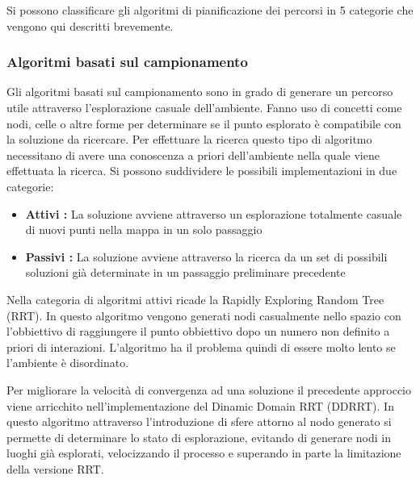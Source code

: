 Si possono classificare gli algoritmi di pianificazione dei percorsi in 5 categorie che vengono qui descritti brevemente.

\subsubsection{Algoritmi basati sul campionamento}

Gli algoritmi basati sul campionamento sono in grado di generare un percorso utile attraverso l'esplorazione casuale dell'ambiente. Fanno uso di concetti come nodi, celle o altre forme per determinare se il punto esplorato è compatibile con la soluzione da ricercare. Per effettuare la ricerca questo tipo di algoritmo necessitano di avere una conoscenza a priori dell'ambiente nella quale viene effettuata la ricerca.
Si possono suddividere le possibili implementazioni in due categorie:
\begin{itemize}
	\item \textbf{Attivi : } La soluzione avviene attraverso un esplorazione totalmente casuale di nuovi punti nella mappa in un solo passaggio
	\item \textbf{Passivi : }  La soluzione avviene attraverso la ricerca da un set di possibili soluzioni già determinate in un passaggio preliminare precedente
\end{itemize}





Nella categoria di algoritmi attivi ricade la Rapidly Exploring Random Tree (RRT). In questo algoritmo vengono generati nodi casualmente nello spazio con l'obbiettivo di raggiungere il punto obbiettivo dopo un numero non definito a priori di interazioni. L'algoritmo ha il problema quindi di essere molto lento se l'ambiente è disordinato.

Per migliorare la velocità di convergenza ad una soluzione il precedente approccio viene arricchito nell'implementazione del Dinamic Domain RRT (DDRRT). In questo algoritmo attraverso l'introduzione di sfere attorno al nodo generato si permette di determinare lo stato di esplorazione, evitando di generare nodi in luoghi già esplorati, velocizzando il processo e superando in parte la limitazione della versione RRT.

